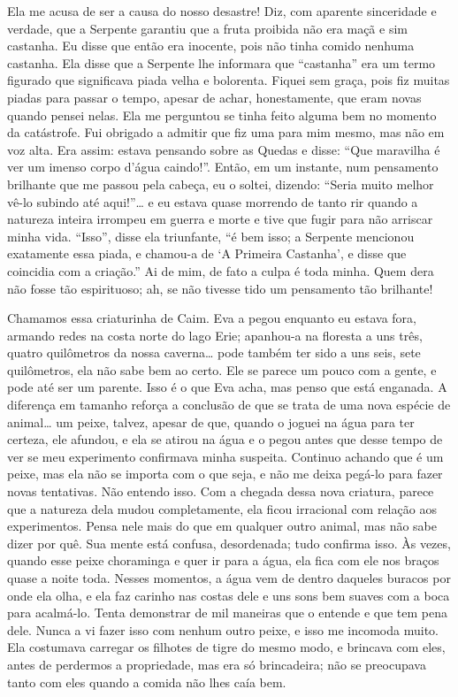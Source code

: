   Ela me acusa de ser a causa do nosso desastre! Diz, com
aparente sinceridade e verdade, que a Serpente garantiu que a fruta
proibida não era maçã e sim castanha. Eu disse que então era inocente, 
pois não tinha comido nenhuma castanha. Ela disse que a Serpente lhe
informara que “castanha” era um termo figurado que significava piada
velha e bolorenta. Fiquei sem graça, pois fiz muitas piadas para passar o
tempo, apesar de achar, honestamente, que eram novas quando pensei nelas. Ela
me perguntou se tinha feito alguma bem no momento da catástrofe. Fui obrigado a
admitir que fiz uma para mim mesmo, mas não em voz alta. Era assim:
estava pensando sobre as Quedas e disse: “Que maravilha é ver um
imenso corpo d'água caindo!”. Então, em um instante, num
pensamento brilhante que me passou pela cabeça, eu o soltei, dizendo: “Seria
muito melhor vê-lo subindo até aqui!”\ldots{} e eu estava quase morrendo de tanto rir
quando a natureza inteira irrompeu em guerra e morte e tive que fugir para
não arriscar minha vida. ``Isso”, disse ela triunfante, “é bem isso; a Serpente
mencionou exatamente essa piada, e chamou-a de `A Primeira Castanha', e disse que
coincidia com a criação.'' Ai de mim, de fato a culpa é toda minha. Quem dera não
fosse tão espirituoso; ah, se não tivesse tido um pensamento tão brilhante!

  Chamamos essa criaturinha de Caim. Eva a pegou enquanto eu estava
fora, armando redes na costa norte do lago Erie; apanhou-a na floresta a uns
três, quatro quilômetros da nossa caverna\ldots{} pode também ter sido a uns seis, sete
quilômetros, ela não sabe bem ao certo. Ele se parece um pouco com a gente, e
pode até ser um parente. Isso é o que Eva acha, mas penso que está enganada. A
diferença em tamanho reforça a conclusão de que se trata de uma nova espécie de
animal\ldots{} um peixe, talvez, apesar de que, quando o joguei na água para ter
certeza, ele afundou, e ela se atirou na água e o pegou antes que desse tempo
de ver se meu experimento confirmava minha suspeita. Continuo achando
que é um peixe, mas ela não se importa com o que seja, e não me deixa pegá-lo
para fazer novas tentativas. Não entendo isso. Com a chegada dessa nova
criatura, parece que a natureza dela mudou completamente, ela ficou irracional
com relação aos experimentos. Pensa nele mais do que em qualquer outro
animal, mas não sabe dizer por quê. Sua mente está confusa, desordenada; tudo
confirma isso. Às vezes, quando esse peixe choraminga e quer ir para a água,
ela fica com ele nos braços quase a noite toda. Nesses momentos, a água vem
de dentro daqueles buracos por onde ela olha, e ela faz carinho nas
costas dele e uns sons bem suaves com a boca para acalmá-lo. Tenta
demonstrar de mil maneiras que o entende e que tem pena dele. Nunca a vi
fazer isso com nenhum outro peixe, e isso me incomoda muito. Ela
costumava carregar os filhotes de tigre do mesmo modo, e brincava com eles,
antes de perdermos a propriedade, mas era só brincadeira; não se preocupava
tanto com eles quando a comida não lhes caía bem. 

